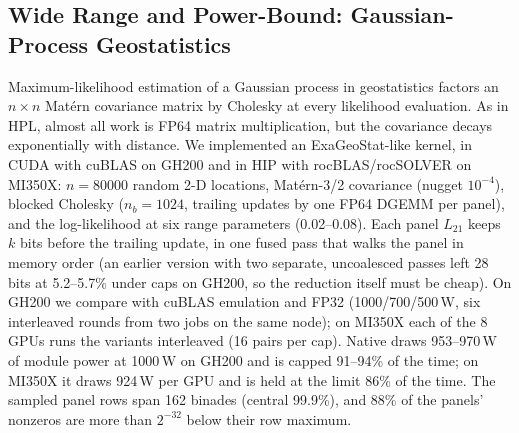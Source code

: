 \documentclass[conference]{IEEEtran}
\newcommand{\W}{\,W}
\newcommand{\pct}{\%}
\begin{document}
\subsection{Wide Range and Power-Bound: Gaussian-Process Geostatistics}\label{sec:gp}

Maximum-likelihood estimation of a Gaussian process in geostatistics factors an $n{\times}n$ Matérn covariance matrix
by Cholesky at every likelihood evaluation. As in HPL, almost all work is FP64 matrix multiplication, but the
covariance decays exponentially with distance. We implemented an ExaGeoStat-like kernel, in CUDA with cuBLAS on GH200
and in HIP with rocBLAS/rocSOLVER on MI350X: $n=80000$ random 2-D locations, Matérn-3/2 covariance (nugget $10^{-4}$),
blocked Cholesky ($n_b=1024$, trailing updates by one FP64 DGEMM per panel), and the log-likelihood at six range
parameters (0.02--0.08). Each panel $L_{21}$ keeps $k$ bits before the trailing update, in one fused pass that walks
the panel in memory order (an earlier version with two separate, uncoalesced passes left 28 bits at 5.2--5.7\pct{} under
caps on GH200, so the reduction itself must be cheap). On GH200 we compare with cuBLAS emulation and FP32 (1000/700/500\W,
six interleaved rounds from two jobs on the same node); on MI350X each of the 8 GPUs runs the variants interleaved
(16 pairs per cap). Native draws 953--970\W{} of module power at 1000\W{} on GH200 and is capped 91--94\pct{} of the
time; on MI350X it draws 924\W{} per GPU and is held at the limit 86\pct{} of the time. The sampled panel rows span 162
binades (central 99.9\pct), and 88\pct{} of the panels' nonzeros are more than $2^{-32}$ below their row maximum.
\end{document}
